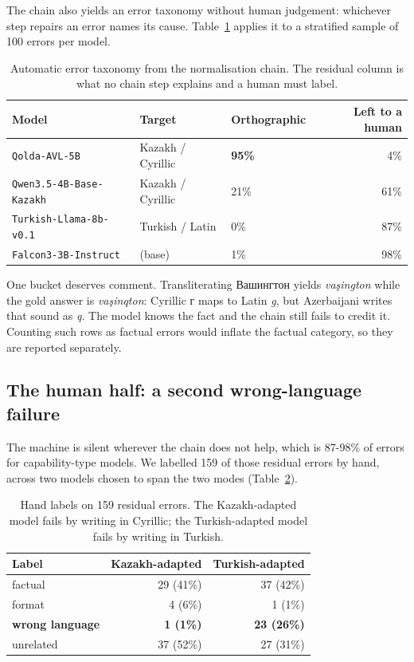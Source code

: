 \documentclass[final]{clv2025}
\DeclareRobustCommand{\cyr}[1]{{\fontencoding{T2A}\selectfont #1}}
\begin{document}
The chain also yields an error taxonomy without human judgement: whichever step
repairs an error names its cause. Table~\ref{tab:taxonomy} applies it to a
stratified sample of 100 errors per model.

\begin{table}[h!]
\caption{Automatic error taxonomy from the normalisation chain. The residual
column is what no chain step explains and a human must label.}
\label{tab:taxonomy}
\centering
\small
\begin{tabular}{lllr}
\toprule
Model & Target & Orthographic & Left to a human \\
\midrule
\texttt{Qolda-AVL-5B} & Kazakh / Cyrillic & \textbf{95\%} & 4\% \\
\texttt{Qwen3.5-4B-Base-Kazakh} & Kazakh / Cyrillic & 21\% & 61\% \\
\texttt{Turkish-Llama-8b-v0.1} & Turkish / Latin & 0\% & 87\% \\
\texttt{Falcon3-3B-Instruct} & (base) & 1\% & 98\% \\
\bottomrule
\end{tabular}
\end{table}

One bucket deserves comment. Transliterating \cyr{Вашингтон} yields
\emph{vaşington} while the gold answer is \emph{vaşinqton}: Cyrillic
\cyr{г} maps to Latin \emph{g}, but Azerbaijani writes that sound as
\emph{q}. The model knows
the fact and the chain still fails to credit it. Counting such rows as factual
errors would inflate the factual category, so they are reported separately.

\subsection{The human half: a second wrong-language failure}

The machine is silent wherever the chain does not help, which is 87-98\% of
errors for capability-type models. We labelled 159 of those residual errors by
hand, across two models chosen to span the two modes
(Table~\ref{tab:human-labels}).

\begin{table}[h!]
\caption{Hand labels on 159 residual errors. The Kazakh-adapted model fails by
writing in Cyrillic; the Turkish-adapted model fails by writing in Turkish.}
\label{tab:human-labels}
\centering
\begin{tabular}{lrr}
\toprule
Label & Kazakh-adapted & Turkish-adapted \\
\midrule
factual & 29 (41\%) & 37 (42\%) \\
format & 4 (6\%) & 1 (1\%) \\
\textbf{wrong language} & \textbf{1 (1\%)} & \textbf{23 (26\%)} \\
unrelated & 37 (52\%) & 27 (31\%) \\
\bottomrule
\end{tabular}
\end{table}
\end{document}
